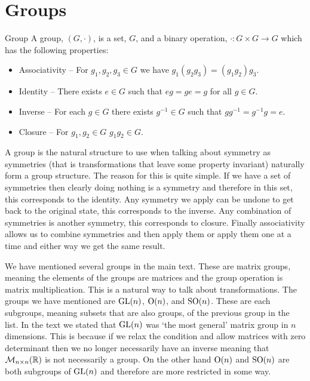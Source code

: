 \section{Groups}\label{app:groups}
\begin{definition}{Group}{}
    A group, \((G, \cdot)\), is a set, \(G\), and a binary operation, \(\cdot\colon G\times G\to G\) which has the following properties:
    \begin{itemize}
        \item Associativity -- For \(g_1, g_2, g_3\in G\) we have \(g_1(g_2g_3) = (g_1g_2)g_3\).
        \item Identity -- There exists \(e\in G\) such that \(eg = ge = g\) for all \(g\in G\).
        \item Inverse -- For each \(g\in G\) there exists \(g^{-1}\in G\) such that \(gg^{-1} = g^{-1}g = e\).
        \item Closure -- For \(g_1, g_2\in G\) \(g_1g_2\in G\).
    \end{itemize}
\end{definition}
A group is the natural structure to use when talking about symmetry as symmetries (that is transformations that leave some property invariant) naturally form a group structure.
The reason for this is quite simple.
If we have a set of symmetries then clearly doing nothing is a symmetry and therefore in this set, this corresponds to the identity.
Any symmetry we apply can be undone to get back to the original state, this corresponds to the inverse.
Any combination of symmetries is another symmetry, this corresponds to closure.
Finally associativity allows us to combine symmetries and then apply them or apply them one at a time and either way we get the same result.

We have mentioned several groups in the main text.
These are matrix groups, meaning the elements of the groups are matrices and the group operation is matrix multiplication.
This is a natural way to talk about transformations.
The groups we have mentioned are \(\mathrm{GL}(n)\), \(\mathrm{O}(n)\), and \(\mathrm{SO}(n)\).
These are each subgroups, meaning subsets that are also groups, of the previous group in the list.
In the text we stated that \(\mathrm{GL}(n)\) was `the most general' matrix group in \(n\) dimensions.
This is because if we relax the condition and allow matrices with zero determinant then we no longer necessarily have an inverse meaning that \(\mathcal{M}_{{n}\times{n}}({\mathbb{R}})\) is not necessarily a group.
On the other hand \(\mathrm{O}(n)\) and \(\mathrm{SO}(n)\) are both subgroups of \(\mathrm{GL}(n)\) and therefore are more restricted in some way.

